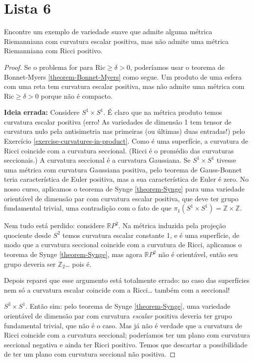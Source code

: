 \section{Lista 6}
\label{section-lista-6}

\begin{exercise}
\label{exercise-positive-scalar-but-no-positive-Ricci}
Encontre um exemplo de variedade suave que admite alguma métrica Riemanniana com
curvatura escalar positiva, mas não admite uma métrica Riemanniana com Ricci
positivo.
\end{exercise}

\begin{proof}
Se o problema for para $\text{Ric}\geq \delta>0$, poderíamos usar o teorema de 
Bonnet-Myers \ref{theorem-Bonnet-Myers} como segue. Um produto de uma esfera com
uma reta tem curvatura escalar positiva, mas não admite uma métrica com 
$\text{Ric}\geq\delta>0$ porque não é compacto.

{\bf Ideia errada:} Considere $S^1\times S^1$. É claro que na métrica produto
temos curvatura escalar positiva (erro! As variedades de dimensão 1 tem tensor
de curvatura nulo pela antisimetria nas primeiras (ou últimas) duas entradas!)
pelo Exercício \ref{exercise-curvatures-in-product}. Como é uma superfície, a
curvatura de Ricci coincide com a curvatura seccional. (Ricci é o promédio das
curvaturas seccionais.) A curvatura seccional é a curvatura Gaussiana. Se
$S^1\times S^1$ tivesse uma métrica com curvatura Gaussiana positiva, pelo
teorema de Gauss-Bonnet teria característica de Euler positiva, mas a sua
característica de Euler é zero. No nosso curso, aplicamos o teorema de Synge
\ref{theorem-Synge} para uma variedade orientável de dimensão par com curvatura
escalar positiva, que deve ter grupo fundamental trivial, uma contradição com o
fato de que $\pi_{1}(S^1\times S^1)=\mathbb{Z}\times\mathbb{Z}$.

Nem tudo está perdido: considere $\mathbb{R}P^{2}$. Na métrica induzida pela
projeção quociente desde $S^2$ temos curvatura escalar constante 1, e é uma
superfície, de modo que a curvatura seccional coincide com a curvatura de Ricci,
aplicamos o teorema de Synge \ref{theorem-Synge}, mas agora $\mathbb{R}P^{2}$
não é orientável, então seu grupo deveria ser $\mathbb{Z}_2$… pois é.

Depois reparei que esse argumento está totalmente errado: no caso das
superfícies nem só a curvatura escalar coincide com a Ricci… também com a
seccional!

 $S^3\times S^1$. Então sim: pelo teorema de
Synge \ref{theorem-Synge}, uma variedade orientável de dimensão par com
curvatura {\it escalar} positiva deveria ter grupo fundamental trivial, que não
é o caso. Mas já não é verdade que a curvatura de Ricci coincide com a curvatura
 seccional; poderíamos ter um plano com curvatura seccional negativa e ainda ter
Ricci positivo. Temos que descartar a possibilidade de ter um plano com
curvatura seccional não positiva.
\end{proof}

